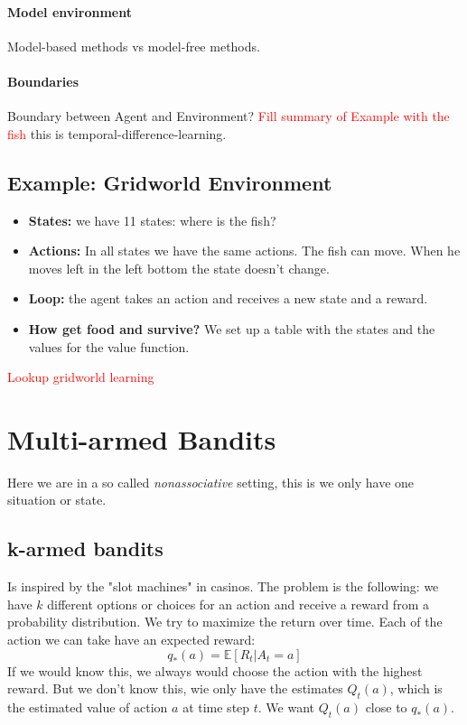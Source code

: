 \documentclass[10pt,a4paper]{article}
\begin{document}
\paragraph{Model environment}
Model-based methods vs model-free methods.

\paragraph{Boundaries}
Boundary between Agent and Environment?  \textcolor{red}{Fill summary of Example with the fish} this is temporal-difference-learning.

\subsection{Example: Gridworld Environment}
\begin{itemize}
\item \textbf{States:} we have 11 states: where is the fish?
\item \textbf{Actions:} In all states we have the same actions. The fish can move. When he moves left in the left bottom the state doesn't change.
\item \textbf{Loop:} the agent takes an action and receives a new state and a reward.
\item \textbf{How get food and survive?} We set up a table with the states and the values for the value function.
\end{itemize}

\textcolor{red}{Lookup gridworld learning}

\section{Multi-armed Bandits}
Here we are in a so called \textit{nonassociative} setting, this is we only have one situation or state.

\subsection{k-armed bandits}
Is inspired by the "slot machines" in casinos. 
The problem is the following: we have $k$ different options or choices for an action and receive a reward from a probability distribution. We try to maximize the return over time. Each of the action we can take have an expected reward:
\[ q_{*}(a) = \mathbb{E}[R_t | A_t = a ] \]
If we would know this, we always would choose the action with the highest reward. But we don't know this, wie only have the estimates $Q_t(a)$, which is the estimated value of action $a$ at time step $t$. We want $Q_t(a)$ close to $q_{*}(a)$.
\end{document}
